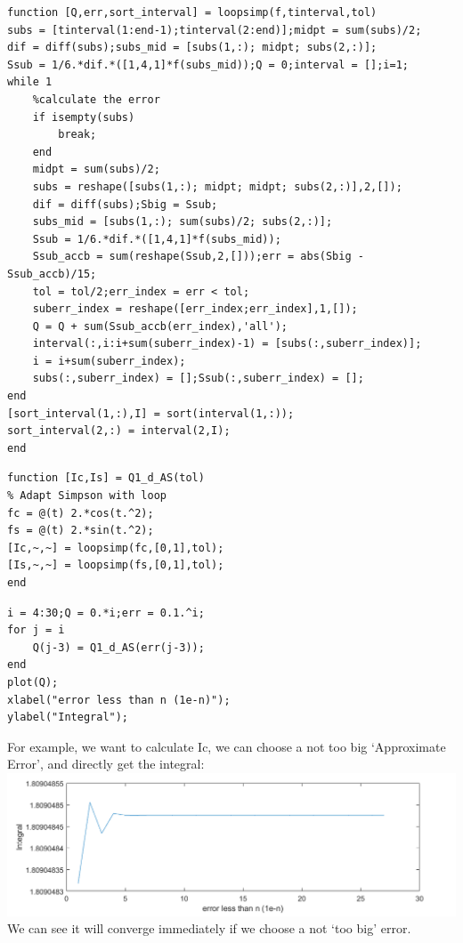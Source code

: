 \documentclass{article}
\begin{document}
\begin{flushleft}
\begin{enumerate}
\begin{framed}
\begin{verbatim}
function [Q,err,sort_interval] = loopsimp(f,tinterval,tol)
subs = [tinterval(1:end-1);tinterval(2:end)];midpt = sum(subs)/2;
dif = diff(subs);subs_mid = [subs(1,:); midpt; subs(2,:)];
Ssub = 1/6.*dif.*([1,4,1]*f(subs_mid));Q = 0;interval = [];i=1;
while 1
    %calculate the error
    if isempty(subs)
        break;
    end
    midpt = sum(subs)/2;
    subs = reshape([subs(1,:); midpt; midpt; subs(2,:)],2,[]);
    dif = diff(subs);Sbig = Ssub;
    subs_mid = [subs(1,:); sum(subs)/2; subs(2,:)];
    Ssub = 1/6.*dif.*([1,4,1]*f(subs_mid));
    Ssub_accb = sum(reshape(Ssub,2,[]));err = abs(Sbig - Ssub_accb)/15;
    tol = tol/2;err_index = err < tol;
    suberr_index = reshape([err_index;err_index],1,[]);
    Q = Q + sum(Ssub_accb(err_index),'all');
    interval(:,i:i+sum(suberr_index)-1) = [subs(:,suberr_index)];
    i = i+sum(suberr_index);
    subs(:,suberr_index) = [];Ssub(:,suberr_index) = [];
end
[sort_interval(1,:),I] = sort(interval(1,:));
sort_interval(2,:) = interval(2,I);
end
\end{verbatim}
\begin{multicols}{2}
\begin{verbatim}
function [Ic,Is] = Q1_d_AS(tol)
% Adapt Simpson with loop
fc = @(t) 2.*cos(t.^2);
fs = @(t) 2.*sin(t.^2);
[Ic,~,~] = loopsimp(fc,[0,1],tol);
[Is,~,~] = loopsimp(fs,[0,1],tol);
end
\end{verbatim}
\columnbreak
\begin{verbatim}
i = 4:30;Q = 0.*i;err = 0.1.^i;
for j = i
    Q(j-3) = Q1_d_AS(err(j-3));
end
plot(Q);
xlabel("error less than n (1e-n)");
ylabel("Integral");
\end{verbatim}
\end{multicols}
For example, we want to calculate Ic, we can choose a not too big `Approximate Error', and directly get the integral:
\newline
\includegraphics[width={0.7\linewidth}]{Q1_d_AS.png}
\newline
We can see it will converge immediately if we choose a not `too big' error.
\end{framed}

\end{enumerate}
\end{flushleft}
\end{document}

